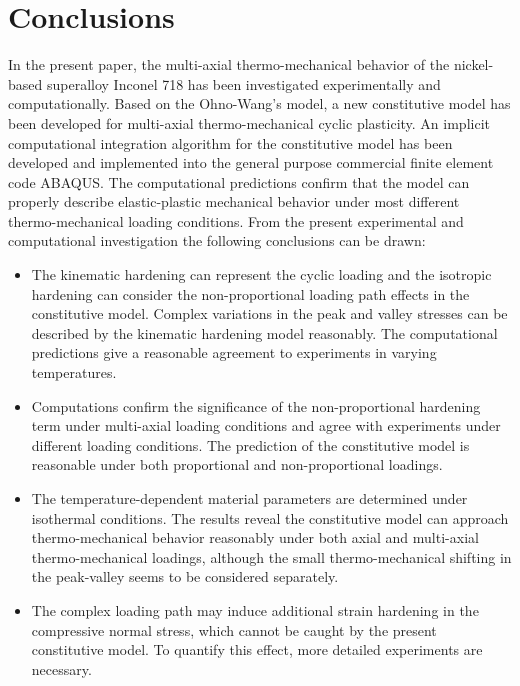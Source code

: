 \documentclass[preprint,5p,twocolumn,11pt,sort&compress]{elsarticle}
\begin{document}
\section{Conclusions}
\noindent
In the present paper, the multi-axial thermo-mechanical behavior of the nickel-based superalloy Inconel 718 has been investigated experimentally and computationally.
Based on the Ohno-Wang's model, a new constitutive model has been developed for multi-axial thermo-mechanical cyclic plasticity.
An implicit computational integration algorithm for the constitutive model has been developed and implemented into the general purpose commercial finite element code ABAQUS. The computational predictions confirm that the model can properly describe elastic-plastic mechanical behavior under most different thermo-mechanical loading conditions.
From the present experimental and computational investigation the following conclusions can be drawn:
\begin{itemize}

\item {The kinematic hardening can represent the cyclic loading and the isotropic hardening can consider the non-proportional loading path effects in the constitutive model.
Complex variations in the peak and valley stresses can be described by the kinematic hardening model reasonably. The computational predictions give a reasonable agreement to  experiments in varying temperatures.}

\item {Computations confirm the significance of the non-proportional hardening term under multi-axial loading conditions and agree with experiments under different loading conditions. The prediction of the constitutive model is reasonable under both proportional and non-proportional loadings.}

\item {The temperature-dependent material parameters are determined under isothermal conditions. The results reveal the constitutive model can approach thermo-mechanical behavior reasonably under both axial and multi-axial thermo-mechanical loadings, although the small thermo-mechanical shifting in the peak-valley seems to be considered separately.}

\item{The complex loading path may induce additional strain hardening in the compressive normal stress, which cannot be caught by the present constitutive model. To quantify this effect, more detailed experiments are necessary.}

\end{itemize}
\end{document}
